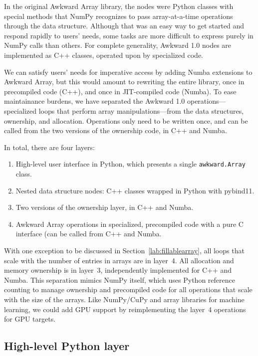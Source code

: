 \documentclass{webofc}
\begin{document}
In the original Awkward Array library, the nodes were Python classes with special methods that NumPy recognizes to pass array-at-a-time operations through the data structure. Although that was an easy way to get started and respond rapidly to users' needs, some tasks are more difficult to express purely in NumPy calls than others. For complete generality, Awkward 1.0 nodes are implemented as C++ classes, operated upon by specialized code.

We can satisfy users' needs for imperative access by adding Numba extensions to Awkward Array, but this would amount to rewriting the entire library, once in precompiled code (C++), and once in JIT-compiled code (Numba). To ease maintainance burdens, we have separated the Awkward 1.0 operations---specialized loops that perform array manipulations---from the data structures, ownership, and allocation. Operations only need to be written once, and can be called from the two versions of the ownership code, in C++ and Numba.

In total, there are four layers:

\begin{enumerate}
\item High-level user interface in Python, which presents a single \texttt{awkward.Array} class.
\item Nested data structure nodes: C++ classes wrapped in Python with pybind11.
\item Two versions of the ownership layer, in C++ and Numba.
\item Awkward Array operations in specialized, precompiled code with a pure C interface (can be called from C++ and Numba.
\end{enumerate}

\noindent With one exception to be discussed in Section~\ref{lab:fillablearray}, all loops that scale with the number of entries in arrays are in layer~4. All allocation and memory ownership is in layer~3, independently implemented for C++ and Numba. This separation mimics NumPy itself, which uses Python reference counting to manage ownership and precompiled code for all operations that scale with the size of the arrays. Like NumPy/CuPy and array libraries for machine learning, we could add GPU support by reimplementing the layer~4 operations for GPU targets.

\subsection{High-level Python layer}
\end{document}
